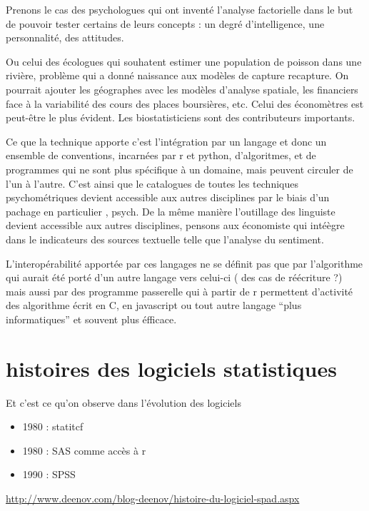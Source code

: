\documentclass[
]{book}
\providecommand{\tightlist}{%
  \setlength{\itemsep}{0pt}\setlength{\parskip}{0pt}}
\begin{document}
Prenons le cas des psychologues qui ont inventé l'analyse factorielle dans le but de pouvoir tester certains de leurs concepts : un degré d'intelligence, une personnalité, des attitudes.

Ou celui des écologues qui souhatent estimer une population de poisson dans une rivière, problème qui a donné naissance aux modèles de capture recapture. On pourrait ajouter les géographes avec les modèles d'analyse spatiale, les financiers face à la variabilité des cours des places boursières, etc. Celui des économètres est peut-être le plus évident. Les biostatisticiens sont des contributeurs importants.

Ce que la technique apporte c'est l'intégration par un langage et donc un ensemble de conventions, incarnées par r et python, d'algoritmes, et de programmes qui ne sont plus spécifique à un domaine, mais peuvent circuler de l'un à l'autre. C'est ainsi que le catalogues de toutes les techniques psychométriques devient accessible aux autres disciplines par le biais d'un pachage en particulier , psych. De la même manière l'outillage des linguiste devient accessible aux autres disciplines, pensons aux économiste qui intéègre dans le indicateurs des sources textuelle telle que l'analyse du sentiment.

L'interopérabilité apportée par ces langages ne se définit pas que par l'algorithme qui aurait été porté d'un autre langage vers celui-ci ( des cas de réécriture ?) mais aussi par des programme passerelle qui à partir de r permettent d'activité des algorithme écrit en C, en javascript ou tout autre langage ``plus informatiques'' et souvent plus éfficace.

\hypertarget{histoires-des-logiciels-statistiques}{%
\section{histoires des logiciels statistiques}\label{histoires-des-logiciels-statistiques}}

Et c'est ce qu'on observe dans l'évolution des logiciels

\begin{itemize}
\tightlist
\item
  1980 : statitcf
\item
  1980 : SAS comme accès à r
\item
  1990 : SPSS
\end{itemize}

\url{http://www.deenov.com/blog-deenov/histoire-du-logiciel-spad.aspx}
\end{document}
